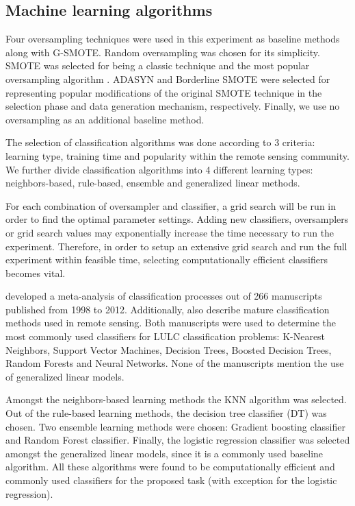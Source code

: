 \documentclass[remotesensing,article,submit,moreauthors,pdftex]{Definitions/mdpi}
\begin{document}
\subsection{Machine learning algorithms}

Four oversampling techniques were used in this experiment as baseline methods
along with G-SMOTE. Random oversampling was chosen for its simplicity. SMOTE was
selected for being a classic technique and the most popular oversampling
algorithm \cite{Douzas2019}. ADASYN \cite{HaiboHe2008} and Borderline SMOTE
\cite{Han2005} were selected for representing popular modifications of the
original SMOTE technique in the selection phase and data generation mechanism,
respectively. Finally, we use no oversampling as an additional baseline method.

The selection of classification algorithms was done according to 3 criteria:
learning type, training time and popularity within the remote sensing community.
We further divide classification algorithms into 4 different learning types:
neighbors-based, rule-based, ensemble and generalized linear methods.

For each combination of oversampler and classifier, a grid search will be run in
order to find the optimal parameter settings. Adding new classifiers,
oversamplers or grid search values may exponentially increase the time necessary
to run the experiment. Therefore, in order to setup an extensive grid search and
run the full experiment within feasible time, selecting computationally
efficient classifiers becomes vital.

\cite{Khatami2016} developed a meta-analysis of classification processes out of
266 manuscripts published from 1998 to 2012. Additionally, \cite{Maxwell2018}
also describe mature classification methods used in remote sensing. Both
manuscripts were used to determine the most commonly used classifiers for LULC
classification problems: K-Nearest Neighbors, Support Vector Machines, Decision
Trees, Boosted Decision Trees, Random Forests and Neural Networks. None of the
manuscripts mention the use of generalized linear models.

Amongst the neighbors-based learning methods the KNN algorithm was selected. Out
of the rule-based learning methods, the decision tree classifier (DT) was
chosen. Two ensemble learning methods were chosen: Gradient boosting classifier
and Random Forest classifier. Finally, the logistic regression classifier was
selected amongst the generalized linear models, since it is a commonly used
baseline algorithm. All these algorithms were found to be computationally
efficient and commonly used classifiers for the proposed task (with exception
for the logistic regression).
\end{document}
